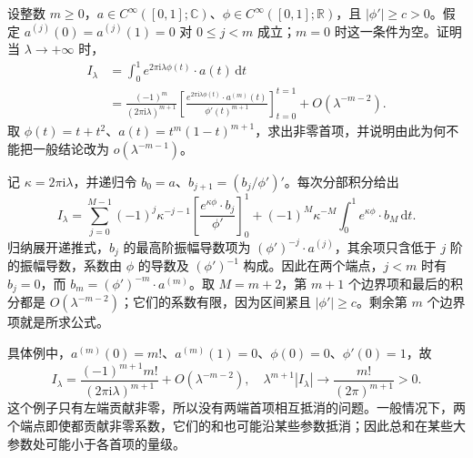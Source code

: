 \begin{exercise}\label{b2:ex:21-new-1}
设整数 \(m\geq0\)，\(a\in C^\infty([0,1];\mathbb C)\)、\(\phi\in C^\infty([0,1];\mathbb R)\)，且 \(|\phi'|\geq c>0\)。假定
\(a^{(j)}(0)=a^{(j)}(1)=0\) 对 \(0\leq j<m\) 成立；\(m=0\) 时这一条件为空。证明当 \(\lambda\to+\infty\) 时，
\[
 \begin{aligned}
 I_\lambda
 &=\int_0^1 e^{2\pi\mathrm i\lambda\phi(t)}\cdot a(t)\,\mathrm dt\\
 &=\frac{(-1)^m}{(2\pi\mathrm i\lambda)^{m+1}}
 \left[\frac{e^{2\pi\mathrm i\lambda\phi(t)}\cdot a^{(m)}(t)}
                  {\phi'(t)^{m+1}}\right]_{t=0}^{t=1}
 +O(\lambda^{-m-2}).
 \end{aligned}
\]
取 \(\phi(t)=t+t^2\)、\(a(t)=t^m(1-t)^{m+1}\)，求出非零首项，并说明由此为何不能把一般结论改为 \(o(\lambda^{-m-1})\)。
\end{exercise}
\begin{solution}
记 \(\kappa=2\pi\mathrm i\lambda\)，并递归令
\(b_0=a\)、\(b_{j+1}=(b_j/\phi')'\)。每次分部积分给出
\[
 I_\lambda
 =\sum_{j=0}^{M-1}(-1)^j\kappa^{-j-1}
       \left[\frac{e^{\kappa\phi}\cdot b_j}{\phi'}\right]_0^1
   +(-1)^M\kappa^{-M}
       \int_0^1e^{\kappa\phi}\cdot b_M\,\mathrm dt.
\]
归纳展开递推式，\(b_j\) 的最高阶振幅导数项为
\((\phi')^{-j}\cdot a^{(j)}\)，其余项只含低于 \(j\) 阶的振幅导数，系数由 \(\phi\) 的导数及 \((\phi')^{-1}\) 构成。因此在两个端点，\(j<m\) 时有 \(b_j=0\)，而
\(b_m=(\phi')^{-m}\cdot a^{(m)}\)。取 \(M=m+2\)，第 \(m+1\) 个边界项和最后的积分都是 \(O(\lambda^{-m-2})\)；它们的系数有限，因为区间紧且 \(|\phi'|\geq c\)。剩余第 \(m\) 个边界项就是所求公式。

具体例中，\(a^{(m)}(0)=m!\)、\(a^{(m)}(1)=0\)、\(\phi(0)=0\)、\(\phi'(0)=1\)，故
\[
 I_\lambda
 =\frac{(-1)^{m+1}m!}{(2\pi\mathrm i\lambda)^{m+1}}
       +O(\lambda^{-m-2}),
 \quad
 \lambda^{m+1}|I_\lambda|
       \longrightarrow\frac{m!}{(2\pi)^{m+1}}>0.
\]
这个例子只有左端贡献非零，所以没有两端首项相互抵消的问题。一般情况下，两个端点即使都贡献非零系数，它们的和也可能沿某些参数抵消；因此总和在某些大参数处可能小于各首项的量级。
\end{solution}

